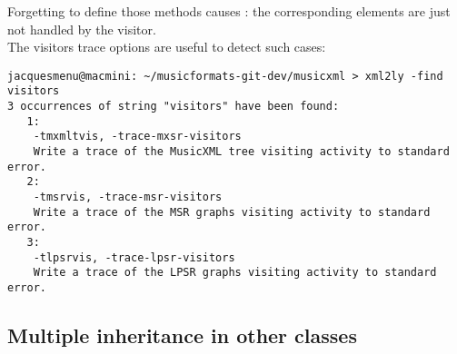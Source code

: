 Forgetting to define those  methods causes : the corresponding elements are just not handled by the visitor.\\
The visitors trace options are useful to detect such cases:
\begin{lstlisting}[language=Terminal]
jacquesmenu@macmini: ~/musicformats-git-dev/musicxml > xml2ly -find visitors
3 occurrences of string "visitors" have been found:
   1:
    -tmxmltvis, -trace-mxsr-visitors
    Write a trace of the MusicXML tree visiting activity to standard error.
   2:
    -tmsrvis, -trace-msr-visitors
    Write a trace of the MSR graphs visiting activity to standard error.
   3:
    -tlpsrvis, -trace-lpsr-visitors
    Write a trace of the LPSR graphs visiting activity to standard error.
\end{lstlisting}


\subsection{Multiple inheritance in other classes}

